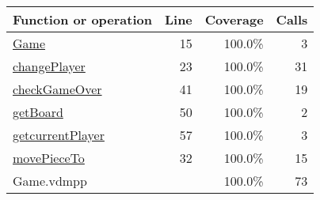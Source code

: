 \bigskip
\begin{longtable}{|l|r|r|r|}
\hline
Function or operation & Line & Coverage & Calls \\
\hline
\hline
\hyperref[Game:15]{Game} & 15&100.0\% & 3 \\
\hline
\hyperref[changePlayer:23]{changePlayer} & 23&100.0\% & 31 \\
\hline
\hyperref[checkGameOver:41]{checkGameOver} & 41&100.0\% & 19 \\
\hline
\hyperref[getBoard:50]{getBoard} & 50&100.0\% & 2 \\
\hline
\hyperref[getcurrentPlayer:57]{getcurrentPlayer} & 57&100.0\% & 3 \\
\hline
\hyperref[movePieceTo:32]{movePieceTo} & 32&100.0\% & 15 \\
\hline
\hline
Game.vdmpp & & 100.0\% & 73 \\
\hline
\end{longtable}

